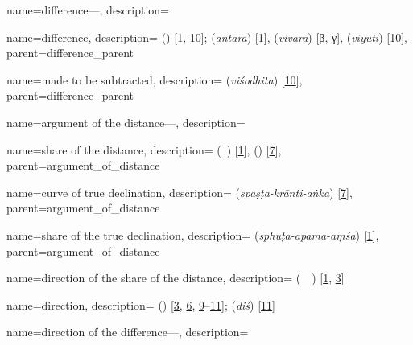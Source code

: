 {
        name={difference---},
        description={\phantom{x}\nopagebreak}
}

{
        name={difference},
        description={ (\tafadul) [\hyperlink{PEpass1}{1}, \hyperlink{PEpass10}{10}];   (\textit{antara}) [\hyperlink{SEpass1}{1}],  (\textit{vivara}) [\hyperlink{SEpassB}{β}, \hyperlink{SEpassC}{γ}],  (\textit{viyuti})} [\hyperlink{SEpass10}{10}],
        parent={difference_parent}
}

{
        name={made to be subtracted},
        description={ (\textit{viśodhita}) [\hyperlink{SEpass10}{10}]},
        parent={difference_parent}
}

{
        name={argument of the distance---},
        description={\phantom{x}\nopagebreak}
}

{
        name={share of the distance},
        description={ (\hissi\idafavowel\ \bud) [\hyperlink{PEpass1}{1}],  (\hissatalbud) [\hyperlink{PEpass7}{7}]},
        parent={argument_of_distance}
}

{
        name={curve of true declination},
        description={ (\textit{spaṣṭa-krānti-aṅka}) [\hyperlink{SEpass7}{7}]},
        parent={argument_of_distance}
}

{
        name={share of the true declination},
        description={ (\textit{sphuṭa-apama-aṃśa}) [\hyperlink{SEpass1}{1}]},
        parent={argument_of_distance}
}


{
        name={direction of the share of the distance},
        description={ (\jahat\idafaconsonant\ \hissi\idafavowel\ \bud) [\hyperlink{PEpass1}{1}, \hyperlink{PEpass3}{3}]}
}

{
        name={direction},
        description={ (\jahat) [\hyperlink{PEpass3}{3}, \hyperlink{PEpass6}{6}, \hyperlink{PEpass9}{9}--\hyperlink{PEpass11}{11}];  (\textit{diś}) [\hyperlink{SEpass11}{11}]}
}

{
        name={direction of the difference---},
        description={\phantom{x}\nopagebreak}
}

